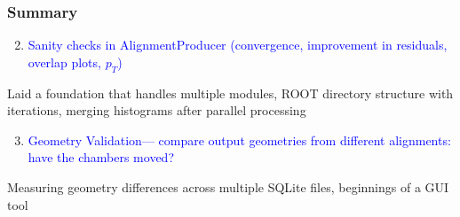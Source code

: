 \documentclass[compress]{beamer}
\begin{document}
\begin{frame}
\frametitle{Summary}
\begin{enumerate}\setcounter{enumi}{1}
\item \textcolor{blue}{Sanity checks in AlignmentProducer (convergence, improvement in residuals, overlap plots, $p_T$)}
\end{enumerate}

Laid a foundation that handles multiple modules, ROOT directory
structure with iterations, merging histograms after parallel processing

\vfill \vfill

\begin{enumerate}\setcounter{enumi}{2}
\item \textcolor{blue}{Geometry Validation--- compare output geometries from different alignments: have the chambers moved?}
\end{enumerate}

Measuring geometry differences across multiple SQLite files, beginnings of a GUI tool

\label{numpages}
\end{frame}
\end{document}
